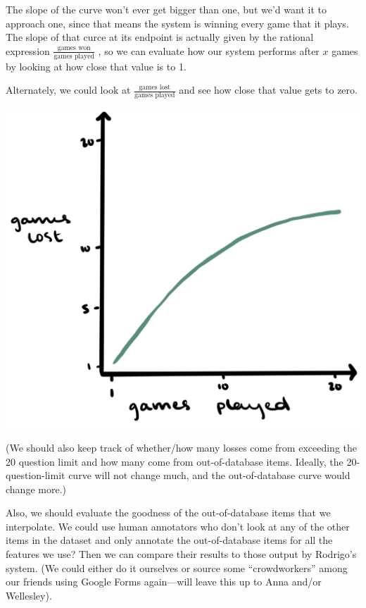 \documentclass[a4paper,12pt]{article}
\begin{document}
The slope of the curve won't ever get bigger than one, but we'd want it to approach one, since that means the system is winning every game that it plays.
The slope of that curce at its endpoint is actually given by the rational expression $\frac{\text{games won}}{\text{games played}}$ \citep{Baayen2001}, so we can evaluate how our system performs after $x$ games by looking at how close that value is to 1.

Alternately, we could look at $\frac{\text{games lost}}{\text{games played}}$ and see how close that value gets to zero.

\begin{center}
	\includegraphics[width=.5\linewidth]{growth-curve2.png}
\end{center}

(We should also keep track of whether/how many losses come from exceeding the 20 question limit and how many come from out-of-database items. Ideally, the 20-question-limit curve will not change much, and the out-of-database curve would change more.)

Also, we should evaluate the goodness of the out-of-database items that we interpolate.
We could use human annotators who don't look at any of the other items in the dataset and only annotate the out-of-database items for all the features we use? 
Then we can compare their results to those output by Rodrigo's system. 
(We could either do it ourselves or source some ``crowdworkers'' among our friends using Google Forms again---will leave this up to Anna and/or Wellesley).

\singlespacing
\printbibliography
\end{document}
